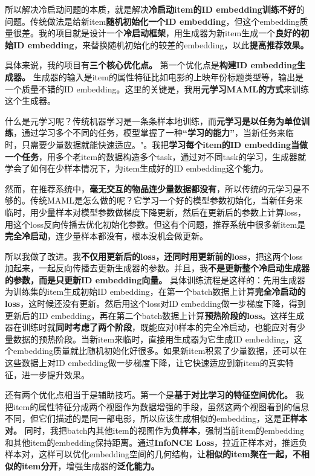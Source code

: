 \documentclass[UTF8]{ctexart}
\begin{document}
所以解决冷启动问题的本质，就是解决\textbf{冷启动item的ID embedding训练不好}的问题。传统做法是给新item\textbf{随机初始化一个ID embedding}，但这个embedding质量很差。我的项目就是设计一个\textbf{冷启动框架}，用生成器为新item生成一个\textbf{良好的初始ID embedding}，来替换随机初始化的较差的embedding，以此\textbf{提高推荐效果。}

具体来说，我的项目有\textbf{三个核心优化点。} 第一个优化点是\textbf{构建ID embedding生成器。} 生成器的输入是item的属性特征比如电影的上映年份标题类型等，输出是一个质量不错的ID embedding。这里的关键是，我用\textbf{元学习MAML的方式}来训练这个生成器。

什么是元学习呢？传统机器学习是一条条样本地训练，而\textbf{元学习是以任务为单位训练}，通过学习多个不同的任务，模型掌握了一种\textbf{“学习的能力”}，当新任务来临时，只需要少量数据就能快速适应。"。我把\textbf{学习每个item的ID embedding当做一个任务}，用多个老item的数据构造多个task，通过对不同task的学习，生成器就学会了如何在少样本情况下，为item生成好的ID embedding这个能力。

然而，在推荐系统中，\textbf{毫无交互的物品连少量数据都没有}，所以传统的元学习是不够的。传统MAML是怎么做的呢？它学习一个好的模型参数初始化，当新任务来临时，用少量样本对模型参数做梯度下降更新，然后在更新后的参数上计算loss，用这个loss反向传播去优化初始化参数。但这有个问题，推荐系统中很多新item是\textbf{完全冷启动}，连少量样本都没有，根本没机会做更新。

所以我做了改进。我\textbf{不仅用更新后的loss，还同时用更新前的loss}，把这两个loss加起来，一起反向传播去更新生成器的参数。并且，我\textbf{不是更新整个冷启动生成器的参数，而是只更新ID embedding向量。} 具体训练流程是这样的：先用生成器为训练集的item生成初始ID embedding，在第一个batch数据上计算\textbf{完全冷启动的loss}，这时候还没有更新。然后用这个loss对ID embedding做一步梯度下降，得到更新后的ID embedding，再在第二个batch数据上计算\textbf{预热阶段的loss}。这样生成器在训练时就\textbf{同时考虑了两个阶段}，既能应对0样本的完全冷启动，也能应对有少量数据的预热阶段。当新item来临时，直接用生成器为它生成ID embedding，这个embedding质量就比随机初始化好很多。如果新item积累了少量数据，还可以在这些数据上对ID embedding做一步梯度下降，让它快速适应到新item的真实特征，进一步提升效果。


还有两个优化点相当于是辅助技巧。第一个是\textbf{基于对比学习的特征空间优化。} 我把item的属性特征分成两个视图作为数据增强的手段，虽然这两个视图看到的信息不同，但它们描述的是同一部电影，所以应该生成相似的embedding，这是\textbf{正样本对。} 同时，我把batch内其他item的视图作为\textbf{负样本}，强制当前item的embedding和其他item的embedding保持距离。通过\textbf{InfoNCE Loss}，拉近正样本对，推远负样本对，这样可以优化embedding空间的几何结构，让\textbf{相似的item聚在一起，不相似的item分开}，增强生成器的\textbf{泛化能力。}
\end{document}
